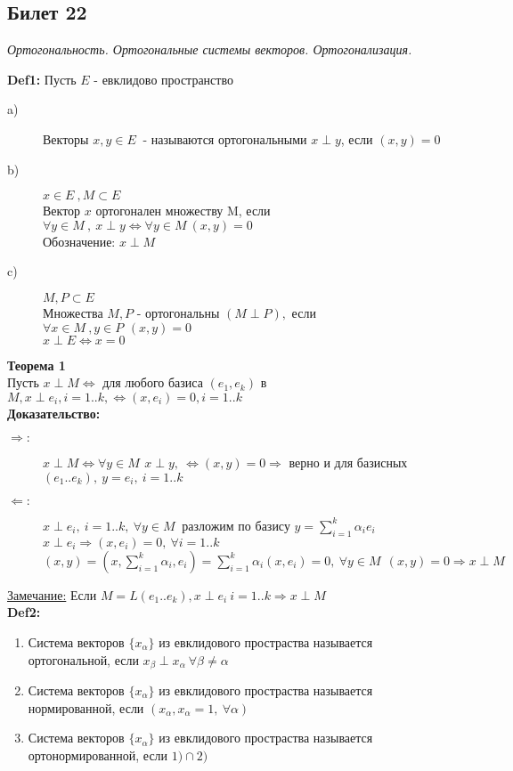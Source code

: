 \subsection{Билет 22}


\textit{Ортогональность. Ортогональные системы векторов. Ортогонализация.}


\textbf{Def1: } Пусть $E$ - евклидово пространство
\begin{description}
 \item [a)] Векторы $x,y \in E\ $ - называются ортогональными $x \perp y$, если $\left( x,y \right)=0$
 \item [b)] $x \in E\ , M \subset E$ \\
	Вектор $x$ ортогонален множеству M, если $\forall y \in M\ , \ x \perp y \Leftrightarrow \forall y \in M\ \left( x,y \right) = 0 $ \\
	Обозначение: $x \perp M$ 
 \item [c)] $M,P \subset E$ \\
	Множества $M,P$ - ортогональны $\left( M \perp P \right),$ если $\forall x \in M\ , y \in P\, \ \left( x,y \right)=0  $ \\
	$x \perp E \Leftrightarrow x=0 $
\end{description} 
\textbf{Теорема 1} \\
 Пусть $x \perp M \Leftrightarrow$ для любого базиса $(e_1,e_k)$ в $M,  x \perp e_i,  i=1..k,  \Leftrightarrow (x,e_i)=0, i=1..k $ \\
\textbf{Доказательство:} \\
\begin{description}
 \item [$\Rightarrow :$] $x \perp M \Leftrightarrow \forall y \in M\, \ x \perp y, \ \Leftrightarrow (x,y)=0 \Rightarrow$ верно и для базисных 
	$(e_1..e_k), \ y=e_i, \ i=1..k$
 \item [$\Leftarrow :$] $x \perp e_i, \ i=1..k, \ \forall y \in M\ $ разложим по базису $y = \sum \limits_{i=1}^k {\alpha_i e_i}$ \\
	$x \perp e_i \Rightarrow (x,e_i)=0, \ \forall i=1..k$ \\
	$(x,y)=(x,\sum \limits_{i=1}^k {\alpha_i,e_i}) = \sum \limits_{i=1}^k {\alpha_i (x,e_i) = 0, \ \forall y \in M\ \ (x,y)=0 \Rightarrow x \perp M } $
\end{description}
\underline{Замечание:} Если $M=L(e_1..e_k), x \perp e_i \ i=1..k \Rightarrow x \perp M $ \\
\textbf{Def2: } 
\begin{enumerate}
 \item Система векторов $\{x_{\alpha}\}$ из евклидового простраства называется ортогональной, если $x_{\beta} \perp x_{\alpha} \ \forall \beta \ne \alpha$
 \item Система векторов $\{x_{\alpha}\}$ из евклидового простраства называется нормированной, если $(x_{\alpha},x_{\alpha}=1, \ \forall \alpha)$
 \item Система векторов $\{x_{\alpha}\}$ из евклидового простраства называется ортонормированной, если $1) \cap 2)$
\end{enumerate}
